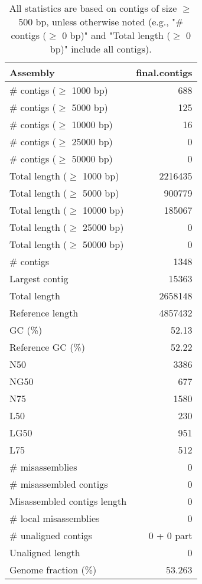 \documentclass[12pt,a4paper]{article}
\begin{document}
\begin{table}[ht]
\begin{center}
\caption{All statistics are based on contigs of size $\geq$ 500 bp, unless otherwise noted (e.g., "\# contigs ($\geq$ 0 bp)" and "Total length ($\geq$ 0 bp)" include all contigs).}
\begin{tabular}{|l*{1}{|r}|}
\hline
Assembly & final.contigs \\ \hline
\# contigs ($\geq$ 1000 bp) & 688 \\ \hline
\# contigs ($\geq$ 5000 bp) & 125 \\ \hline
\# contigs ($\geq$ 10000 bp) & 16 \\ \hline
\# contigs ($\geq$ 25000 bp) & 0 \\ \hline
\# contigs ($\geq$ 50000 bp) & 0 \\ \hline
Total length ($\geq$ 1000 bp) & 2216435 \\ \hline
Total length ($\geq$ 5000 bp) & 900779 \\ \hline
Total length ($\geq$ 10000 bp) & 185067 \\ \hline
Total length ($\geq$ 25000 bp) & 0 \\ \hline
Total length ($\geq$ 50000 bp) & 0 \\ \hline
\# contigs & 1348 \\ \hline
Largest contig & 15363 \\ \hline
Total length & 2658148 \\ \hline
Reference length & 4857432 \\ \hline
GC (\%) & 52.13 \\ \hline
Reference GC (\%) & 52.22 \\ \hline
N50 & 3386 \\ \hline
NG50 & 677 \\ \hline
N75 & 1580 \\ \hline
L50 & 230 \\ \hline
LG50 & 951 \\ \hline
L75 & 512 \\ \hline
\# misassemblies & 0 \\ \hline
\# misassembled contigs & 0 \\ \hline
Misassembled contigs length & 0 \\ \hline
\# local misassemblies & 0 \\ \hline
\# unaligned contigs & 0 + 0 part \\ \hline
Unaligned length & 0 \\ \hline
Genome fraction (\%) & 53.263 \\ \hline

\end{tabular}
\end{center}
\end{table}
\end{document}
